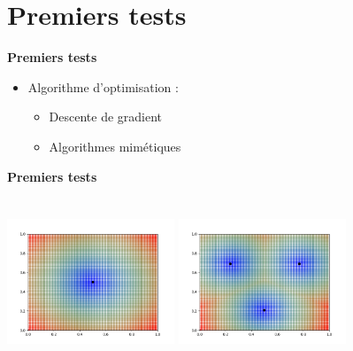 \documentclass[10pt]{beamer}
\begin{document}
\section{Premiers tests}
\begin{frame}{\textbf{Premiers tests}}

    \begin{itemize}
        \item Algorithme d'optimisation :
        \begin{itemize}
            \item Descente de gradient
            \item Algorithmes mimétiques
        \end{itemize}
    \end{itemize}

\end{frame}


\begin{frame}{\textbf{Premiers tests}}

    \begin{center}
        \includegraphics[height=5cm, width=5cm]{../../Figure_1pt_0att.png}
        \includegraphics[height=5cm, width=5cm]{../../Figure_3pt_0att.png}
    \end{center}

\end{frame}
\end{document}
